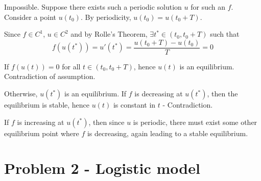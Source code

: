 \documentclass[12pt]{article}
\begin{document}
\begin{enumerate}[label=(\roman*)]
          Impossible. Suppose there exists such a periodic solution $u$ for such an $f$. Consider a point $u(t_0)$. By periodicity, $u(t_0) = u(t_0 + T)$.

          Since $f \in C^1$, $u \in C^2$ and by Rolle's Theorem, $\exists t^* \in (t_0, t_0 + T)$ such that
          \[f(u(t^*)) = u'(t^*) = \frac{u(t_0 + T) - u(t_0)}{T} = 0\]

          If $f(u(t)) = 0$ for all $t \in (t_0, t_0 + T)$, hence $u(t)$ is an equilibrium. Contradiction of assumption.

          Otherwise, $u(t^*)$ is an equilibrium. If $f$ is decreasing at $u(t^*)$, then the equilibrium is stable, hence $u(t)$ is constant in $t$ - Contradiction.

          If $f$ is increasing at $u(t^*)$, then since $u$ is periodic, there must exist some other equilibrium point where $f$ is decreasing, again leading to a stable equilibrium.
          \color{black}
\end{enumerate}



\pagebreak
\section*{Problem 2 - Logistic model}
\end{document}
